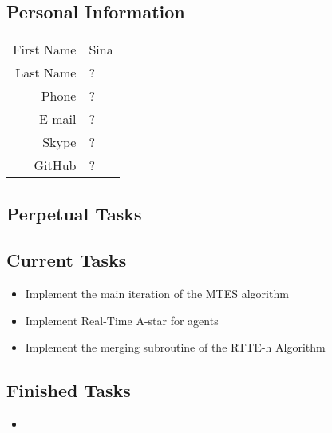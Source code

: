 \subsection{Personal Information}
\begin{table}[h!]
	\begin{tabular}{rl}
	First Name 	& Sina\\
	Last Name	& ?\\
	Phone		& ?\\
	E-mail		& ?\\
	Skype		& ?\\
	GitHub		& ?
\end{tabular}
\end{table}

\subsection{Perpetual Tasks}

\subsection{Current Tasks}
\begin{itemize}
	\item Implement the main iteration of the MTES algorithm
	\item Implement Real-Time A-star for agents
	\item Implement the merging subroutine of the RTTE-h Algorithm
\end{itemize}

\subsection{Finished Tasks}
\begin{itemize}
	\item 
\end{itemize}